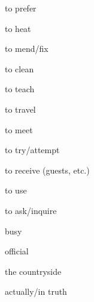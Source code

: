 \documentclass[avery5371,grid,frame]{flashcards}
\begin{document}
\begin{flashcard}{\LARGE to prefer}
\LARGE {}
\end{flashcard}
\begin{flashcard}{\LARGE to heat}
\LARGE {}
\end{flashcard}
\begin{flashcard}{\LARGE to mend/fix}
\LARGE {}
\end{flashcard}
\begin{flashcard}{\LARGE to clean}
\LARGE {}
\end{flashcard}
\begin{flashcard}{\LARGE to teach}
\LARGE {}
\end{flashcard}
\begin{flashcard}{\LARGE to travel}
\LARGE {}
\end{flashcard}
\begin{flashcard}{\LARGE to meet}
\LARGE {}
\end{flashcard}
\begin{flashcard}{\LARGE to try/attempt}
\LARGE {}
\end{flashcard}
\begin{flashcard}{\LARGE to receive (guests, etc.)}
\LARGE {}
\end{flashcard}
\begin{flashcard}{\LARGE to use}
\LARGE {}
\end{flashcard}
\begin{flashcard}{\LARGE to ask/inquire}
\LARGE {}
\end{flashcard}
\begin{flashcard}{\LARGE busy}
\LARGE {}
\end{flashcard}
\begin{flashcard}{\LARGE official}
\LARGE {}
\end{flashcard}
\begin{flashcard}{\LARGE the countryside}
\LARGE {}
\end{flashcard}
\begin{flashcard}{\LARGE actually/in truth}
\LARGE {}
\end{flashcard}
\end{document}
